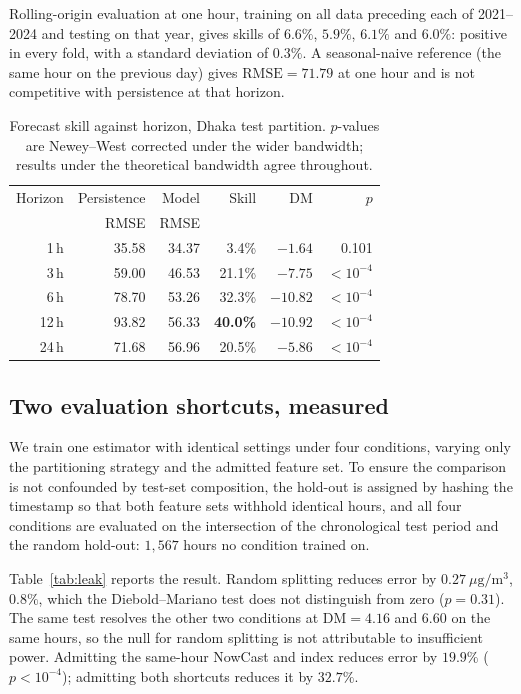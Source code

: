 \documentclass[conference,a4paper]{IEEEtran}
\begin{document}
Rolling-origin evaluation at one hour, training on all data preceding each of
2021--2024 and testing on that year, gives skills of $6.6\%$, $5.9\%$, $6.1\%$
and $6.0\%$: positive in every fold, with a standard deviation of $0.3\%$. A
seasonal-naive reference (the same hour on the previous day) gives
$\mathrm{RMSE} = 71.79$ at one hour and is not competitive with persistence at
that horizon.

\begin{table}[t]
\caption{Forecast skill against horizon, Dhaka test partition. $p$-values are
Newey--West corrected under the wider bandwidth; results under the theoretical
bandwidth agree throughout.}
\label{tab:horizon}
\centering
\small
\begin{tabular}{@{}rrrrrr@{}}
\toprule
Horizon & Persistence & Model & Skill & DM & $p$ \\
        & RMSE        & RMSE  &       &    &     \\
\midrule
1\,h  & 35.58 & 34.37 &  3.4\% &  $-1.64$ & 0.101 \\
3\,h  & 59.00 & 46.53 & 21.1\% &  $-7.75$ & $<10^{-4}$ \\
6\,h  & 78.70 & 53.26 & 32.3\% & $-10.82$ & $<10^{-4}$ \\
12\,h & 93.82 & 56.33 & \textbf{40.0\%} & $-10.92$ & $<10^{-4}$ \\
24\,h & 71.68 & 56.96 & 20.5\% &  $-5.86$ & $<10^{-4}$ \\
\bottomrule
\end{tabular}
\end{table}

\subsection{Two evaluation shortcuts, measured}
\label{sec:leak}
We train one estimator with identical settings under four conditions, varying
only the partitioning strategy and the admitted feature set. To ensure the
comparison is not confounded by test-set composition, the hold-out is assigned by
hashing the timestamp so that both feature sets withhold identical hours, and all
four conditions are evaluated on the intersection of the chronological test
period and the random hold-out: $1{,}567$ hours no condition trained on.

Table~\ref{tab:leak} reports the result. Random splitting reduces error by
$0.27~\mu\mathrm{g/m^3}$, $0.8\%$, which the Diebold--Mariano test does not
distinguish from zero ($p=0.31$). The same test resolves the other two conditions
at $\mathrm{DM}=4.16$ and $6.60$ on the same hours, so the null for random
splitting is not attributable to insufficient power. Admitting the same-hour
NowCast and index reduces error by $19.9\%$ ($p<10^{-4}$); admitting both
shortcuts reduces it by $32.7\%$.
\end{document}
